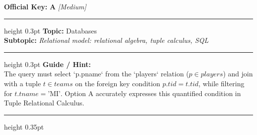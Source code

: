 \documentclass[a4paper,10pt]{article}
\begin{document}
\begin{tcolorbox}
\textbf{Official Key:} \textbf{\large A} \hfill \textit{\small [Medium]}
\vspace{2pt}\hrule height 0.3pt\vspace{3pt}
\textbf{Topic:} Databases \\
\textbf{Subtopic:} \textit{Relational model: relational algebra, tuple calculus, SQL}
\vspace{2pt}\hrule height 0.3pt\vspace{3pt}
\textbf{Guide / Hint:} \\
{\small The query must select `p.pname` from the `players` relation ($p \in players$) and join with a tuple $t \in teams$ on the foreign key condition $p.tid = t.tid$, while filtering for $t.tname = \text{'MI'}$. Option A accurately expresses this quantified condition in Tuple Relational Calculus.}

\end{tcolorbox}
\vspace{6pt}\hrule height 0.35pt\vspace{6pt}
\noindent
\end{document}
